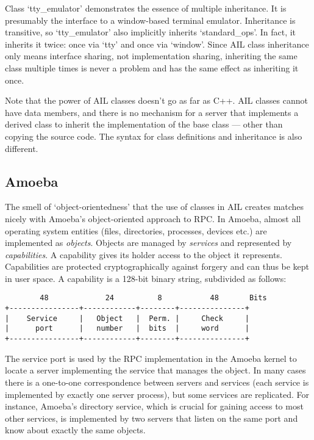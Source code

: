 Class `tty\_emulator' demonstrates the essence of multiple inheritance.
It is presumably the interface to a window-based terminal emulator.
Inheritance is transitive, so `tty\_emulator' also implicitly inherits
`standard\_ops'.
In fact, it inherits it twice: once via `tty' and once via `window'.
Since AIL class inheritance only means interface sharing, not
implementation sharing, inheriting the same class multiple times is
never a problem and has the same effect as inheriting it once.

Note that the power of AIL classes doesn't go as far as C++.
AIL classes cannot have data members, and there is
no mechanism for a server that implements a derived class
to inherit the implementation of the base
class --- other than copying the source code.
The syntax for class definitions and inheritance is also different.

\subsection{Amoeba}

The smell of `object-orientedness' that the use of classes in AIL
creates matches nicely with Amoeba's object-oriented approach to
RPC\@.  In Amoeba, almost all operating system entities (files,
directories, processes, devices etc.) are implemented as {\em
objects}.  Objects are managed by {\em services} and represented by
{\em capabilities}.  A capability gives its holder access to the
object it represents.  Capabilities are protected cryptographically
against forgery and can thus be kept in user space.  A capability is a
128-bit binary string, subdivided as follows:

\begin{verbatim}
        48             24          8           48       Bits
+----------------+------------+--------+---------------+
|    Service     |   Object   |  Perm. |     Check     |
|      port      |   number   |  bits  |     word      |
+----------------+------------+--------+---------------+
\end{verbatim}

The service port is used by the RPC implementation in the Amoeba
kernel to locate a server implementing the service that manages the
object.  In many cases there is a one-to-one correspondence between
servers and services (each service is implemented by exactly one
server process), but some services are replicated.  For instance,
Amoeba's directory service, which is crucial for gaining access to most
other services, is implemented by two servers that listen on the same
port and know about exactly the same objects.


